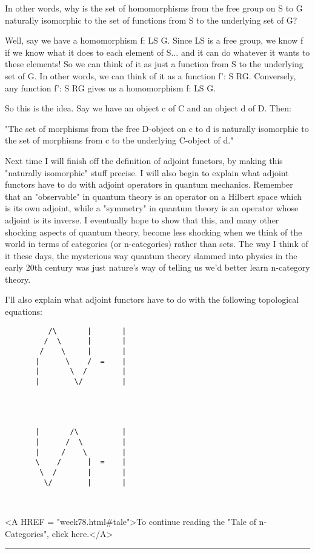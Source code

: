 In other words, why is the set of homomorphisms from the free group on S
to G naturally isomorphic to the set of functions from S to the
underlying set of G?
  
Well, say we have a homomorphism f: LS \to  G.  Since LS is a free group,
we know f if we know what it does to each element of S... and it can
do whatever it wants to these elements!  So we can think of it
as just a function from S to the underlying set of G.  In other words,
we can think of it as a function f': S \to  RG.  Conversely, any function
f': S \to  RG gives us a homomorphism f: LS \to  G.

So this is the idea.  Say we have an object c of C and an object d of D.
Then:

"The set of morphisms from the free D-object on c to d is naturally
isomorphic to the set of morphisms from c to the underlying C-object of
d."

Next time I will finish off the definition of adjoint functors, by
making this "naturally isomorphic" stuff precise.  I will also begin to
explain what adjoint functors have to do with adjoint operators in
quantum mechanics.  Remember that an "observable" in quantum theory is
an operator on a Hilbert space which is its own adjoint, while a
"symmetry" in quantum theory is an operator whose adjoint is its
inverse.  I eventually hope to show that this, and many other shocking
aspects of quantum theory, become less shocking when we think of the
world in terms of categories (or n-categories) rather than sets.  The
way I think of it these days, the mysterious way quantum theory slammed
into physics in the early 20th century was just nature's way of telling
us we'd better learn n-category theory.

I'll also explain what adjoint functors have to do with the following
topological equations:


\begin{verbatim}
          /\       |       |
         /  \      |       |
        /    \     |       |
       |      \    /  =    | 
       |       \  /        |
       |        \/         |




       |       /\          |
       |      /  \         |
       |     /    \        |
       \    /      |  =    | 
        \  /       |       |
         \/        |       |



\end{verbatim}
    




<A HREF = "week78.html#tale">To continue reading the "Tale of
n-Categories", click here.</A>


\par\noindent\rule{\textwidth}{0.4pt}


